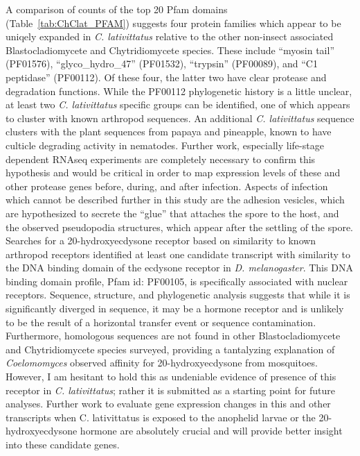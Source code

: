 \indent A comparison of counts of the top 20 Pfam domains (Table~\ref{tab:ChClat_PFAM}) suggests four protein families which appear to be uniqely expanded in \textit{C. lativittatus} relative to the other non-insect associated Blastocladiomycete and Chytridiomycete species. These include \enquote{myosin tail} (PF01576), \enquote{glyco\_hydro\_47} (PF01532), \enquote{trypsin} (PF00089), and \enquote{C1 peptidase} (PF00112). Of these four, the latter two have clear protease and degradation functions. While the PF00112 phylogenetic history is a little unclear, at least two \textit{C. lativittatus} specific groups can be identified, one of which appears to cluster with known arthropod sequences. An additional \textit{C. lativittatus} sequence clusters with the plant sequences from papaya and pineapple, known to have culticle degrading activity in nematodes. Further work, especially life-stage dependent RNAseq experiments are completely necessary to confirm this hypothesis and would be critical in order to map expression levels of these and other protease genes before, during, and after infection. Aspects of infection which cannot be described further in this study are the adhesion vesicles, which are hypothesized to secrete the \enquote{glue} that attaches the spore to the host, and the observed pseudopodia structures, which appear after the settling of the spore. \\
\indent Searches for a 20-hydroxyecdysone receptor based on similarity to known arthropod receptors identified at least one candidate transcript with similarity to the DNA binding domain of the ecdysone receptor in \textit{D. melanogaster}. This DNA binding domain profile, Pfam id: PF00105, is specifically associated with nuclear receptors. Sequence, structure, and phylogenetic analysis suggests that while it is significantly diverged in sequence, it may be a hormone receptor and is unlikely to be the result of a horizontal transfer event or sequence contamination. Furthermore, homologous sequences are not found in other Blastocladiomycete and Chytridiomycete species surveyed, providing a tantalyzing explanation of \textit{Coelomomyces} observed affinity for 20-hydroxyecdysone from mosquitoes. However, I am hesitant to hold this as undeniable evidence of presence of this receptor in \textit{C. lativittatus}; rather it is submitted as a starting point for future analyses. Further work to evaluate gene expression changes in this and other transcripts when C. lativittatus is exposed to the anophelid larvae or the 20-hydroxyecdysone hormone are absolutely crucial and will provide better insight into these candidate genes. \\
